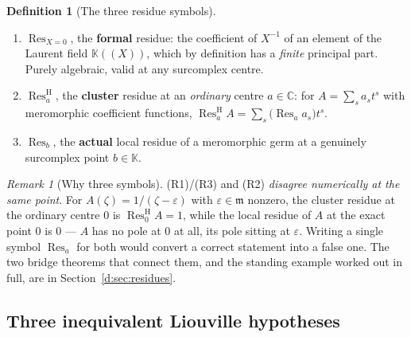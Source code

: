 \documentclass[11pt,a4paper]{article}
\numberwithin{equation}{section}
\theoremstyle{definition}
\newtheorem{definition}[theorem]{Definition}
\theoremstyle{remark}
\newtheorem{remark}[theorem]{Remark}
\theoremstyle{plain}
\newcommand{\K}{\mathbb K}
\newcommand{\CC}{\mathbb C}
\newcommand{\mm}{\mathfrak m}
\newcommand{\tm}{t}
\DeclareMathOperator{\Res}{Res}                 %
\newcommand{\ResH}[1]{\Res^{\mathrm H}_{#1}}    %
\newcommand{\Resat}[1]{\Res_{#1}}               %
\begin{document}
\begin{definition}[The three residue symbols]\label{a:def:threeres}
\begin{enumerate}[label=\textup{(R\arabic*)},leftmargin=2.8em]
\item $\Res_{X=0}$, the \textbf{formal} residue: the coefficient of
$X^{-1}$ of an element of the Laurent field $\K((X))$, which by
definition has a \emph{finite} principal part.  Purely algebraic, valid
at any surcomplex centre.
\item $\ResH a$, the \textbf{cluster} residue at an \emph{ordinary} centre
$a\in\CC$: for $A=\sum_s a_s\tm^{s}$ with meromorphic coefficient
functions, $\ResH a A=\sum_s\bigl(\Res_a a_s\bigr)\tm^{s}$.
\item $\Resat b$, the \textbf{actual} local residue of a meromorphic germ
at a genuinely surcomplex point $b\in\K$.
\end{enumerate}
\end{definition}

\begin{remark}[Why three symbols]\label{a:rem:resdisagree}
(R1)/(R3) and (R2) \emph{disagree numerically at the same point}.  For
$A(\zeta)=1/(\zeta-\varepsilon)$ with $\varepsilon\in\mm$ nonzero, the
cluster residue at the ordinary centre $0$ is $\ResH0 A=1$, while the
local residue of $A$ at the exact point $0$ is $0$ --- $A$ has no pole
at $0$ at all, its pole sitting at $\varepsilon$.  Writing a single
symbol $\Res_a$ for both would convert a correct statement into a false
one.  The two bridge theorems that connect them, and the standing
example worked out in full, are in Section~\ref{d:sec:residues}.
\end{remark}

\subsection{Three inequivalent Liouville hypotheses}\label{a:rem:liouvillehyp}
\end{document}
